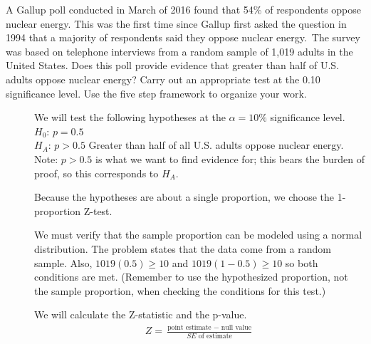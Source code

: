\begin{examplewrap}
\begin{nexample}
{A Gallup poll conducted in March of 2016 found that 54\% of respondents oppose nuclear energy.  This was the first time since Gallup first asked the question in 1994 that a majority of respondents said they oppose nuclear energy.\footnotemark\, The survey was based on telephone interviews from a random sample of 1,019 adults in the United States. Does this poll provide evidence that greater than half of U.S. adults oppose nuclear energy?  Carry out an appropriate test at the 0.10 significance level.  Use the five step framework to organize your work.  }
\label{NuclearEnergy}
\begin{description}
\item[]  We will test the following hypotheses at the $\alpha=10\%$ significance level.\\
$H_0$: $p = 0.5$   \\
$H_A$: $p > 0.5$ \quad Greater than half of all U.S. adults oppose nuclear energy. \\
 
Note: $p>0.5$ is what we want to find evidence for; this bears the burden of proof, so this corresponds to $H_A$.
\item[] Because the hypotheses are about a single proportion, we choose the 1-proportion Z-test.
\item[]  We must verify that the sample proportion can be modeled using a normal distribution.  The problem states that the data come from a random sample.  Also, $1019(0.5)\geq10$ and $1019(1-0.5)\geq10$ so both conditions are met.  (Remember to use the hypothesized proportion, not the sample proportion, when checking the conditions for this test.)
\item[  ]  We will calculate the Z-statistic and the p-value.
\begin{align*}
Z = \frac{\text{point estimate } - \text{ null value}}{SE \text{ of estimate}}
\end{align*}


\end{description}
\end{nexample}
\end{examplewrap}
